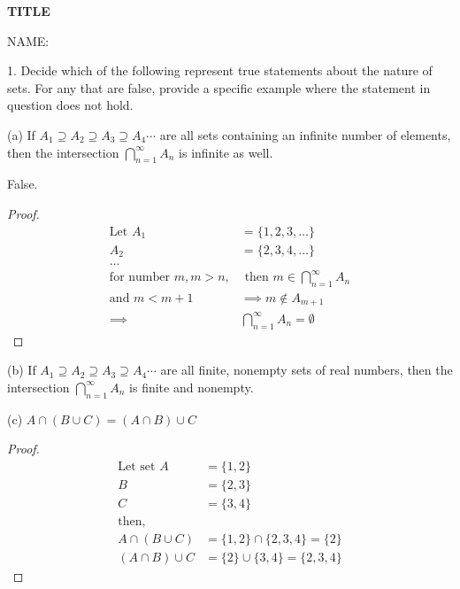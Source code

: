 \documentclass[12pt]{article}
\begin{document}
\begin{center}
    \textbf{TITLE}
\end{center}

NAME: 

1. Decide which of the following represent true statements about the nature of sets.
For any that are false, provide a specific example where the statement in question does not hold.

(a) If $A_1 \supseteq A_2 \supseteq A_3 \supseteq A_4 \cdots$ are all sets containing an infinite number of elements,
then the intersection $\bigcap\limits_{n=1}^{\infty} A_n$ is infinite as well.

False.
\begin{proof}
    \begin{align*}
        \text{Let } A_1              & = \{1,2,3,\ldots\}                             \\
        A_2                          & = \{2,3,4,\ldots\}                             \\
        \ldots                                                                        \\
        \text{for number } m, m > n, & \text{ then } m \in \bigcap_{n=1}^{\infty} A_n \\
        \text{and } m < m+1          & \implies m \not\in A_{m+1}                     \\
        \implies                     & \bigcap_{n=1}^{\infty}A_n = \emptyset
    \end{align*}
\end{proof}

(b) If $A_1 \supseteq A_2 \supseteq A_3 \supseteq A_4 \cdots$ are all finite, nonempty sets of real numbers,
then the intersection $\bigcap\limits_{n=1}^{\infty} A_n$ is finite and nonempty.

(c) $A \cap (B \cup C) = (A \cap B) \cup C$
\begin{proof}
    \begin{align*}
        \text{Let set } A & = \{1,2\}                        \\
        B                 & = \{2,3\}                        \\
        C                 & = \{3,4\}                        \\
        \text{then, }                                        \\
        A \cap (B \cup C) & = \{1,2\} \cap \{2,3,4\} = \{2\} \\
        (A \cap B) \cup C & = \{2\} \cup \{3,4\} = \{2,3,4\}
    \end{align*}
\end{proof}
\end{document}
